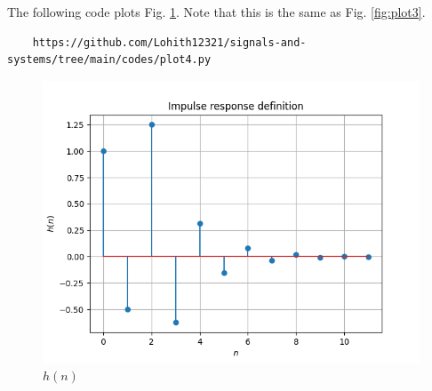 \documentclass[journal,12pt,twocolumn]{IEEEtran}
\theoremstyle{remark}
\begin{document}
\begin{enumerate}[label=\thesection.\arabic*
,ref=\thesection.\theenumi]
\begin{enumerate}[label=\thesection.\arabic*
,ref=\thesection.\theenumi]
\begin{enumerate}[label=\thesection.\arabic*
,ref=\thesection.\theenumi]
The following code plots Fig. \ref{fig:plot4}. Note that this is the same as Fig. 
\ref{fig:plot3}. 
\begin{lstlisting}
    https://github.com/Lohith12321/signals-and-systems/tree/main/codes/plot4.py
\end{lstlisting}
\begin{figure}[ht]
    \centering  
\includegraphics[width=\columnwidth]{figs/plot4.png}
\begin{center}
    \caption{$h(n)$}
\end{center}
    \label{fig:plot4}
\end{figure}



\end{enumerate}
\end{enumerate}
\end{enumerate}
\end{document}
